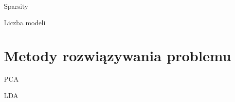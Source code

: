 \documentclass[a4paper]{beamer}
\begin{document}
\begin{frame}
\begin{block}{Sparsity}

\end{block}
\end{frame}
\begin{frame}
\begin{block}{Liczba modeli}

\end{block}
\end{frame}

\section{Metody rozwiązywania problemu}
\begin{frame}
\begin{block}{PCA}

\end{block}
\begin{block}{LDA}

\end{block}
\end{frame}
\end{document}

